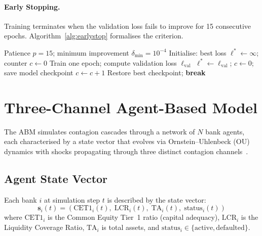 \paragraph{Early Stopping.}
Training terminates when the validation loss fails to improve for 15 consecutive epochs. Algorithm~\ref{alg:earlystop} formalises the criterion.

\begin{algorithm}[H]
\caption{Early Stopping with Patience}
\label{alg:earlystop}
\begin{algorithmic}[1]
\Require Patience $p = 15$; minimum improvement $\delta_{\min} = 10^{-4}$
\State Initialise: best loss $\ell^* \gets \infty$; counter $c \gets 0$
    \State Train one epoch; compute validation loss $\ell_{\text{val}}$
        \State $\ell^* \gets \ell_{\text{val}}$; $c \gets 0$; save model checkpoint
    \Else
        \State $c \gets c + 1$
    \EndIf
        \State Restore best checkpoint; \textbf{break}
    \EndIf
\EndFor
\end{algorithmic}
\end{algorithm}


\section{Three-Channel Agent-Based Model}
\label{sec:abm-method}

The ABM simulates contagion cascades through a network of $N$ bank agents, each characterised by a state vector that evolves via Ornstein--Uhlenbeck (OU) dynamics with shocks propagating through three distinct contagion channels~\cite{tesfatsion2006agent,nier2007network}.

\subsection{Agent State Vector}

Each bank $i$ at simulation step $t$ is described by the state vector:
\begin{equation}
    \mathbf{s}_i(t) = \left(\text{CET1}_i(t),\; \text{LCR}_i(t),\; \text{TA}_i(t),\; \text{status}_i(t)\right)
    \label{eq:agent-state}
\end{equation}
where $\text{CET1}_i$ is the Common Equity Tier~1 ratio (capital adequacy), $\text{LCR}_i$ is the Liquidity Coverage Ratio, $\text{TA}_i$ is total assets, and $\text{status}_i \in \{\text{active}, \text{defaulted}\}$.

